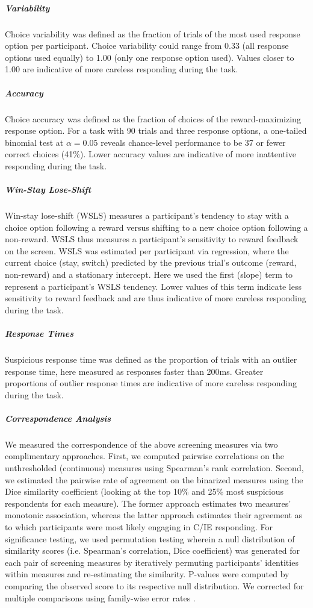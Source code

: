 \documentclass[a4paper,notitlepage,12pt]{article}
\begin{document}
\subparagraph{Variability} Choice variability was defined as the fraction of trials of the most used response option per participant. Choice variability could range from 0.33 (all response options used equally) to 1.00 (only one response option used). Values closer to 1.00 are indicative of more careless responding during the task.  

\subparagraph{Accuracy} Choice accuracy was defined as the fraction of choices of the reward-maximizing response option. For a task with 90 trials and three response options, a one-tailed binomial test at $\alpha=0.05$ reveals chance-level performance to be 37 or fewer correct choices (41\%). Lower accuracy values are indicative of more inattentive responding during the task.

\subparagraph{Win-Stay Lose-Shift} Win-stay lose-shift (WSLS) measures a participant's tendency to stay with a choice option following a reward versus shifting to a new choice option following a non-reward. WSLS thus measures a participant's sensitivity to reward feedback on the screen. WSLS was estimated per participant via regression, where the current choice (stay, switch) predicted by the previous trial's outcome (reward, non-reward) and a stationary intercept. Here we used the first (slope) term to represent a participant's WSLS tendency. Lower values of this term indicate less sensitivity to reward feedback and are thus indicative of more careless responding during the task.

\subparagraph{Response Times} Suspicious response time was defined as the proportion of trials with an outlier response time, here measured as responses faster than 200ms. Greater proportions of outlier response times are indicative of more careless responding during the task.  

\subparagraph{Correspondence Analysis} We measured the correspondence of the above screening measures via two complimentary approaches. First, we computed pairwise correlations on the unthresholded (continuous) measures using Spearman's rank correlation. Second, we estimated the pairwise rate of agreement on the binarized measures using the Dice similarity coefficient (looking at the top 10\% and 25\% most suspicious respondents for each measure). The former approach estimates two measures' monotonic association, whereas the latter approach estimates their agreement as to which participants were most likely engaging in C/IE responding. For significance testing, we used permutation testing wherein a null distribution of similarity scores (i.e. Spearman's correlation, Dice coefficient) was generated for each pair of screening measures by iteratively permuting participants' identities within measures and re-estimating the similarity. P-values were computed by comparing the observed score to its respective null distribution. We corrected for multiple comparisons using family-wise error rates \cite{winkler2014permutation}.
\end{document}

